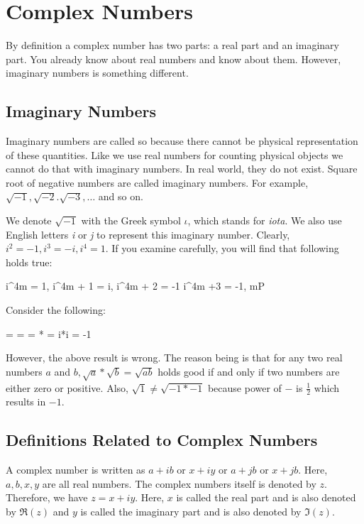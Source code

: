 \chapter{Complex Numbers}
By definition a complex number has two parts: a real part and an imaginary part. You already know about real numbers and know about
them. However, imaginary numbers is something different.
\section{Imaginary Numbers}
Imaginary numbers are called so because there cannot be physical representation of these quantities. Like we use real numbers for
counting physical objects we cannot do that with imaginary numbers. In real world, they do not exist. Square root of negative
numbers are called imaginary numbers. For example, $\sqrt{-1}, \sqrt{-2}. \sqrt{-3}, \ldots$ and so on.

We denote $\sqrt{-1}$ with the Greek symbol $\iota$, which stands for {\it iota}. We also use English letters {\it i} or
{\it j} to represent this imaginary number. Clearly, $i^2 = -1, i^3 = -i, i^4 = 1$. If you examine carefully, you will find that
following holds true:

\startformula i^{4m} = 1, i^{4m + 1} = i, i^{4m + 2} = -1 \;\; i^{4m +3} = -1, \forall m\in P\stopformula

{\bf\color[red]{Gotcha:}}

Consider the following:

 =  =  = * = i*i = -1\stopformula

However, the above result is wrong. The reason being is that for any two real numbers $a$ and $b, \sqrt{a}*\sqrt{b} = \sqrt{ab}$
holds good if and only if two numbers are either zero or positive. Also, $\sqrt{1}\neq \sqrt{-1*-1}$ because power of $-$ is
$\frac{1}{2}$ which results in $-1$.

\section{Definitions Related to Complex Numbers}
A complex number is written as $a + ib$ or $x + iy$ or $a + jb$ or $x + jb$. Here, $a, b, x, y$ are all real numbers. The complex
numbers itself is denoted by $z$. Therefore, we have $z = x + iy$. Here, $x$ is called the real part and is also denoted by $\Re(z)$
and $y$ is called the imaginary part and is also denoted by $\Im(z)$.

